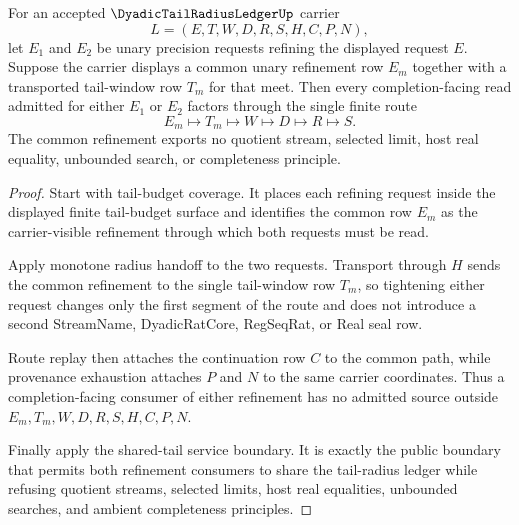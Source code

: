 \begin{theorem}
\label{thm:dyadic-tail-radius-ledger-refinement-meet-totality}
For an accepted $\DyadicTailRadiusLedgerUp$ carrier
$$
L=(E,T,W,D,R,S,H,C,P,N),
$$
let $E_1$ and $E_2$ be unary precision requests refining the displayed request $E$. Suppose the carrier displays a common unary refinement row $E_m$ together with a transported tail-window row $T_m$ for that meet. Then every completion-facing read admitted for either $E_1$ or $E_2$ factors through the single finite route
$$
E_m \longmapsto T_m \longmapsto W \longmapsto D \longmapsto R \longmapsto S.
$$
The common refinement exports no quotient stream, selected limit, host real equality, unbounded search, or completeness principle.
\end{theorem}
\begin{proof}
Start with tail-budget coverage. It places each refining request inside the displayed finite tail-budget surface and identifies the common row $E_m$ as the carrier-visible refinement through which both requests must be read.

Apply monotone radius handoff to the two requests. Transport through $H$ sends the common refinement to the single tail-window row $T_m$, so tightening either request changes only the first segment of the route and does not introduce a second StreamName, DyadicRatCore, RegSeqRat, or Real seal row.

Route replay then attaches the continuation row $C$ to the common path, while provenance exhaustion attaches $P$ and $N$ to the same carrier coordinates. Thus a completion-facing consumer of either refinement has no admitted source outside $E_m,T_m,W,D,R,S,H,C,P,N$.

Finally apply the shared-tail service boundary. It is exactly the public boundary that permits both refinement consumers to share the tail-radius ledger while refusing quotient streams, selected limits, host real equalities, unbounded searches, and ambient completeness principles.
\end{proof}

